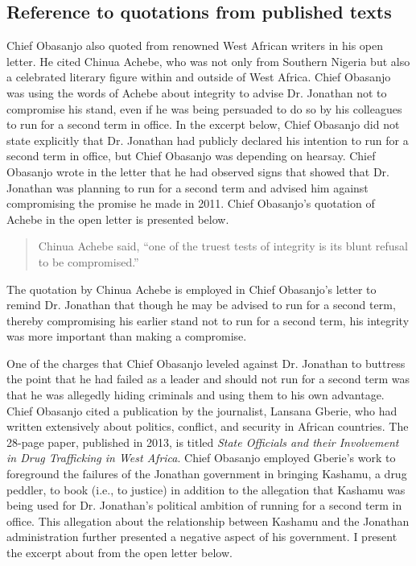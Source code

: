 \documentclass[output=paper,colorlinks,citecolor=brown]{langscibook}
\begin{document}
\subsection{Reference to quotations from published texts}

Chief Obasanjo also quoted from renowned West African writers in his open letter. He cited Chinua Achebe, who was not only from Southern Nigeria but also a celebrated literary figure within and outside of West Africa. Chief Obasanjo was using the words of Achebe about integrity to advise Dr. Jonathan not to compromise his stand, even if he was being persuaded to do so by his colleagues to run for a second term in office. In the excerpt below, Chief Obasanjo did not state explicitly that Dr. Jonathan had publicly declared his intention to run for a second term in office, but Chief Obasanjo was depending on hearsay. Chief Obasanjo wrote in the letter that he had observed signs that showed that Dr. Jonathan was planning to run for a second term and advised him against compromising the promise he made in 2011. Chief Obasanjo’s quotation of Achebe in the open letter is presented below.

\begin{quote}
Chinua Achebe said, “one of the truest tests of integrity is its blunt refusal to be compromised.”
\end{quote}

The quotation by Chinua Achebe is employed in Chief Obasanjo’s letter to remind Dr. Jonathan that though he may be advised to run for a second term, thereby compromising his earlier stand not to run for a second term, his integrity was more important than making a compromise. 

One of the charges that Chief Obasanjo leveled against Dr. Jonathan to buttress the point that he had failed as a leader and should not run for a second term was that he was allegedly hiding criminals and using them to his own advantage. Chief Obasanjo cited a publication by the journalist, Lansana Gberie, who had written extensively about politics, conflict, and security in African countries. The 28-page paper, published in 2013, is titled \textit{State Officials and their Involvement in Drug Trafficking in West Africa}. Chief Obasanjo employed Gberie’s work to foreground  the failures of the Jonathan government in bringing Kashamu, a drug peddler, to book (i.e., to justice) in addition to the allegation that Kashamu was being used for Dr. Jonathan’s political ambition of running for a second term in office. This allegation about the relationship between Kashamu and the Jonathan administration further presented a negative aspect of his government. I present the excerpt about \citet{Gberie2013} from the open letter below.
\end{document}
